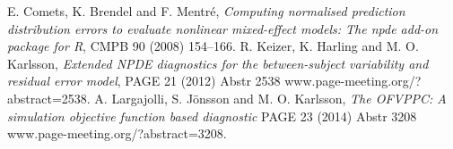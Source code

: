 \begin{thebibliography}{99}
 E. Comets, K. Brendel and F. Mentré,
{\em Computing normalised prediction distribution errors to evaluate nonlinear mixed-effect models: The npde add-on package for R},
CMPB 90 (2008) 154–166.
 R. Keizer, K. Harling and M. O. Karlsson,
{\em Extended NPDE diagnostics for the between-subject variability and residual error model},
PAGE 21 (2012) Abstr 2538 \mbox{www.page-meeting.org/?abstract=2538}.
 A. Largajolli, S. Jönsson and M. O. Karlsson,
{\em The OFVPPC: A simulation objective function based diagnostic}
PAGE 23 (2014) Abstr 3208 \mbox{www.page-meeting.org/?abstract=3208}.
\end{thebibliography}     




